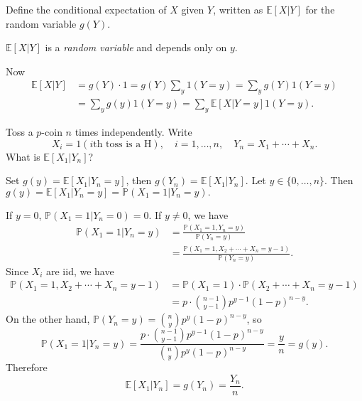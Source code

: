 \begin{definition}
    Define the conditional expectation of $X$ given $Y$, written as $ \mathbb{E}[X|Y] $ for the random variable $g(Y)$.
\end{definition}
\begin{remark}
    $ \mathbb{E}[X|Y] $ is a \textit{random variable} and depends only on $y$.
\end{remark}
Now 
\begin{align*}
    \mathbb{E}[X|Y] &= g(Y)\cdot 1 = g(Y) \sum_{y} 1(Y=y) = \sum_{y} g(Y)1(Y=y)\\ 
    &= \sum_{y} g(y)1(Y=y)=\sum_{y} \mathbb{E}[X|Y=y]1(Y=y).
\end{align*}
\begin{example}\label{eg:2.11}
    Toss a $p$-coin $n$ times independently. Write 
    \[
        X_i = 1(i\text{th toss is a H}),\quad i=1,\dots,n,\quad Y_n=X_1+\cdots+X_n.
    \]
    What is $ \mathbb{E}[X_1|Y_n] $?

    Set $ g(y)=\mathbb{E}[X_1|Y_n=y] $, then $g(Y_n)=\mathbb{E}[X_1|Y_n]$. Let $ y\in \{0,\dots,n\} $. Then $g(y) = \mathbb{E}[X_1|Y_n=y] = \mathbb{P}(X_1=1|Y_n=y).$ 

    If $ y=0 $, $\mathbb{P}(X_1=1|Y_n=0)=0$. If $ y\neq 0 $, we have 
    \begin{align*}
        \mathbb{P}(X_1=1|Y_n=y) &= \frac{\mathbb{P}(X_1=1,Y_n=y)}{\mathbb{P}(Y_n=y)}\\ 
        &= \frac{\mathbb{P}(X_1=1,X_2+\cdots+X_n=y-1)}{\mathbb{P}(Y_n=y)}.
    \end{align*}
    Since $X_i$ are iid, we have 
    \begin{align*}
        \mathbb{P}(X_1=1,X_2+\cdots+X_n=y-1)&= \mathbb{P}(X_1=1)\cdot \mathbb{P}(X_2+\cdots+X_n=y-1)\\ 
        &= p \cdot \binom{n-1}{y-1}p^{y-1}(1-p)^{n-y}.
    \end{align*}
    On the other hand, $ \mathbb{P}(Y_n=y) = \binom{n}{y}p^{y}(1-p)^{n-y} $, so 
    \[
        \mathbb{P}(X_1=1|Y_n=y) = \frac{p \cdot \binom{n-1}{y-1}p^{y-1}(1-p)^{n-y}}{\binom{n}{y}p^{y}(1-p)^{n-y}} = \frac{y}{n} = g(y).
    \]
    Therefore 
    \[
        \mathbb{E}[X_1|Y_n] = g(Y_n) = \frac{Y_n}{n}.
    \]
\end{example}

